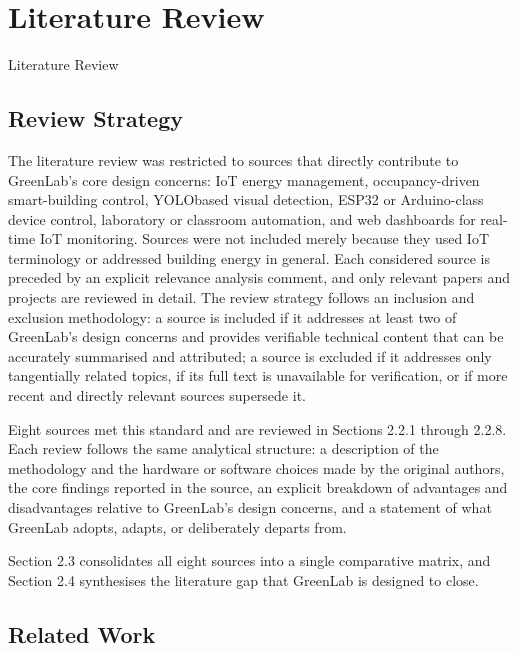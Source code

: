 
\chapter{Literature Review}
\label{ch:literature-review}



Literature Review

\section{Review Strategy}


The literature review was restricted to sources that directly contribute to GreenLab's core
design concerns: IoT energy management, occupancy-driven smart-building control, YOLObased visual detection, ESP32 or Arduino-class device control, laboratory or classroom automation, and web dashboards for real-time IoT monitoring. Sources were not included
merely because they used IoT terminology or addressed building energy in general. Each
considered source is preceded by an explicit relevance analysis comment, and only relevant
papers and projects are reviewed in detail. The review strategy follows an inclusion and exclusion methodology: a source is included if it addresses at least two of GreenLab's design
concerns and provides veriﬁable technical content that can be accurately summarised and
attributed; a source is excluded if it addresses only tangentially related topics, if its full text
is unavailable for veriﬁcation, or if more recent and directly relevant sources supersede it.

Eight sources met this standard and are reviewed in Sections 2.2.1 through 2.2.8.
Each review follows the same analytical structure: a description of the methodology and
the hardware or software choices made by the original authors, the core ﬁndings reported in
the source, an explicit breakdown of advantages and disadvantages relative to GreenLab's
design concerns, and a statement of what GreenLab adopts, adapts, or deliberately departs
from.

Section 2.3 consolidates all eight sources into a single comparative matrix, and Section 2.4 synthesises the literature gap that GreenLab is designed to close.




\section{Related Work}



